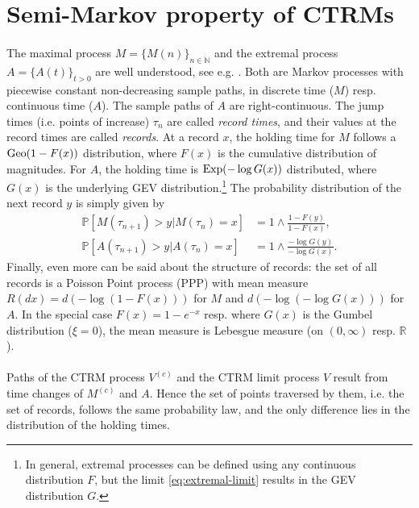 \documentclass[12pt, a4paper]{article}
\newcommand{\PP}{\mathbb{P}}
\newcommand{\1}{\mathbf 1}
\begin{document}
\section{Semi-Markov property of CTRMs}
\label{sec:records}

\paragraph{}
The maximal process $M = \{M(n)\}_{n\in \mathbb N}$ 
and the extremal process $A = \{A(t)\}_{t > 0}$
are well understood, see e.g. \cite[Chapter 4]{resnick2013extreme}. 
Both are Markov processes with piecewise constant non-decreasing sample paths, 
in discrete time ($M$) resp. continuous time ($A$). 
The sample paths of $A$ are right-continuous. 
The jump times (i.e. points of increase) $\tau_n$ are called \emph{record times}, 
and their values at the record times are called \emph{records}. 
At a record $x$, the holding time for $M$ follows a ${\rm Geo}(1-F(x))$ distribution, 
where $F(x)$ is the cumulative distribution of magnitudes. 
For $A$, the holding time is ${\rm Exp}(-\log G(x))$ distributed, where $G(x)$
is the underlying GEV distribution.\footnote{In general, extremal processes can 
be defined using any continuous distribution $F$, but the limit 
\eqref{eq:extremal-limit} results in the GEV distribution $G$.}
The probability distribution of the next record $y$ is simply given by 
\begin{align} \label{eq:record-chain-1}
  \PP[M(\tau_{n+1}) > y | M(\tau_n) = x] &= 1 \wedge \frac{1-F(y)}{1-F(x)}, 
  \\
  \label{eq:record-chain-2}
  \PP[A(\tau_{n+1}) > y | A(\tau_n) = x] &= 1 \wedge \frac{-\log G(y)}{-\log G(x)}.
\end{align}
Finally, even more can be said about the structure of records: 
the set of all records is a Poisson Point process (PPP) with
mean measure $R(dx) = d(-\log (1-F(x)))$ for $M$ and 
$d(-\log (-\log G(x)))$ for $A$.
In the special case $F(x) = 1-e^{-x}$ resp. where $G(x)$ is the Gumbel distribution 
($\xi = 0$), the mean measure is Lebesgue measure (on $(0, \infty)$ resp. $\mathbb R$).


\paragraph{}
Paths of the CTRM process $V^{(c)}$ and the CTRM limit process $V$
result from time changes of $M^{(c)}$ and $A$. 
Hence the set of points traversed by them, i.e. the set of records, 
follows the same probability law, and the only difference lies in the 
distribution of the holding times. 
\end{document}
